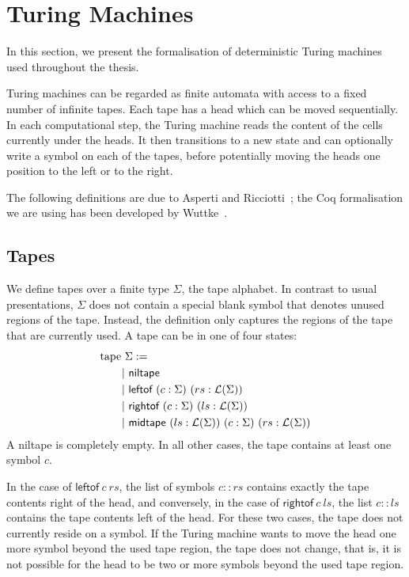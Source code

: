 \section{Turing Machines}
In this section, we present the formalisation of deterministic Turing machines used throughout the thesis. 

Turing machines can be regarded as finite automata with access to a fixed number of infinite tapes. Each tape has a head which can be moved sequentially. 
In each computational step, the Turing machine reads the content of the cells currently under the heads. It then transitions to a new state and can optionally write a symbol on each of the tapes, before potentially moving the heads one position to the left or to the right.

The following definitions are due to Asperti and Ricciotti~\cite{asperti_ricciotti}; the Coq formalisation we are using has been developed by Wuttke~\cite{wuttke2017}.

\subsection{Tapes}
We define tapes over a finite type $\Sigma$, the tape alphabet. In contrast to usual presentations, $\Sigma$ does not contain a special blank symbol that denotes unused regions of the tape. Instead, the definition only captures the regions of the tape that are currently used. 
A tape can be in one of four states:
\begin{align*}
  \text{tape}~&\Sigma  := \\
  |&~\textsf{niltape} \\
  |&~\textsf{leftof}~(c : \Sigma)~(rs : \mathcal{L} (\Sigma)) \\
  |&~\textsf{rightof}~(c : \Sigma)~(ls : \mathcal{L} (\Sigma)) \\
  |&~\textsf{midtape}~(ls : \mathcal{L} (\Sigma))~(c : \Sigma)~(rs : \mathcal{L} (\Sigma))
\end{align*}
A \textsf{niltape} is completely empty. In all other cases, the tape contains at least one symbol $c$. 

In the case of $\textsf{leftof}~c~rs$, the list of symbols $c::rs$ contains exactly the tape contents right of the head, and conversely, in the case of $\textsf{rightof}~c~ls$, the list $c::ls$ contains the tape contents left of the head. For these two cases, the tape does not currently reside on a symbol.
If the Turing machine wants to move the head one more symbol beyond the used tape region, the tape does not change, that is, it is not possible for the head to be two or more symbols beyond the used tape region.

